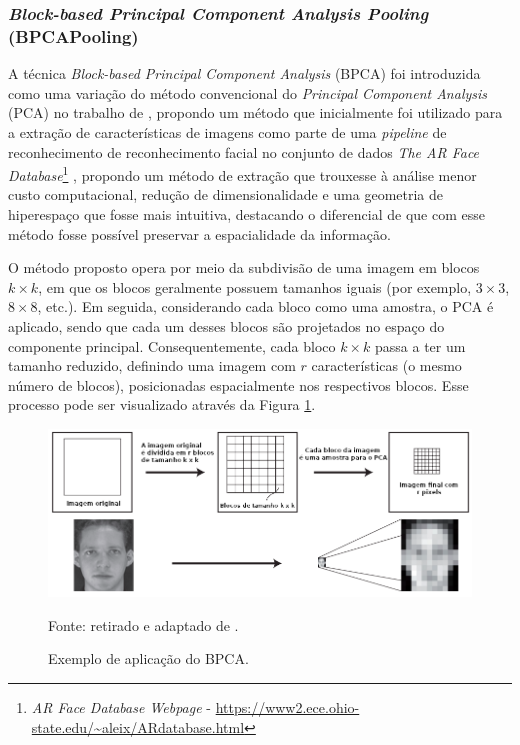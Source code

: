\subsubsection{\textit{Block-based Principal Component Analysis Pooling} (BPCAPooling)}
\label{project:bpca}
A técnica \textit{Block-based Principal Component Analysis} (BPCA) foi introduzida como uma variação do método convencional do \textit{Principal Component Analysis} (PCA) no trabalho de \cite{Salvadeo2011}, propondo um método que inicialmente foi utilizado para a extração de características de imagens como parte de uma \textit{pipeline} de reconhecimento de reconhecimento facial no conjunto de dados \textit{The AR Face Database}\footnote{\textit{AR Face Database Webpage} - \url{https://www2.ece.ohio-state.edu/~aleix/ARdatabase.html}} \citep{MartNez1998TheDatabase}, propondo um método de extração que trouxesse à análise menor custo computacional, redução de dimensionalidade e uma geometria de hiperespaço que fosse mais intuitiva, destacando o diferencial de que com esse método fosse possível preservar a espacialidade da informação.

O método proposto opera por meio da subdivisão de uma imagem em blocos $k \times k$, em que os blocos geralmente possuem tamanhos iguais (por exemplo, $3 \times 3$, $8 \times 8$, etc.). Em seguida, considerando cada bloco como uma amostra, o PCA é aplicado, sendo que cada um desses blocos são projetados no espaço do componente principal. Consequentemente, cada bloco $k \times k$ passa a ter um tamanho reduzido, definindo uma imagem com $r$ características (o mesmo número de blocos), posicionadas espacialmente nos respectivos blocos. Esse processo pode ser visualizado através da Figura \ref{project:fig:bpca_1}.

\begin{figure}[H]
    \centering
    \caption{Exemplo de aplicação do BPCA.}
    \label{project:fig:bpca_1}
    \includegraphics[width=1\textwidth]{recursos/imagens/project/BPCA.png}

    Fonte: retirado e adaptado de \cite{Salvadeo2011}.
\end{figure}

